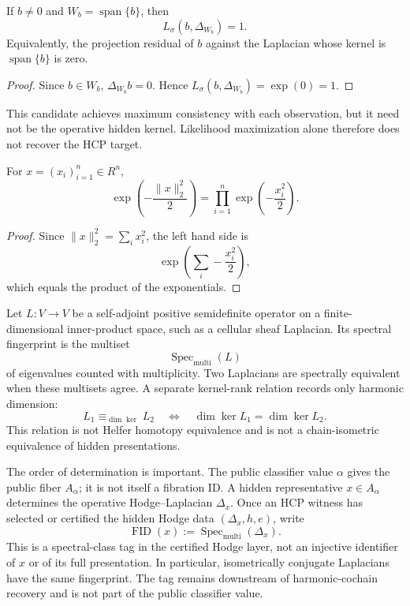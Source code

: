 \begin{proposition}\label{prop:single-observation-optimal-guess}
  If \(b\ne 0\) and \(W_b=\operatorname{span}\{b\}\), then
  \[
    L_\sigma(b,\Delta_{W_b})=1.
  \]
  Equivalently, the projection residual of \(b\) against the Laplacian whose
  kernel is \(\operatorname{span}\{b\}\) is zero.
\end{proposition}

\begin{proof}
  Since \(b\in W_b\), \(\Delta_{W_b}b=0\). Hence
  \(L_\sigma(b,\Delta_{W_b})=\exp(0)=1\).
\end{proof}

This candidate achieves maximum consistency with each observation, but it
need not be the operative hidden kernel. Likelihood maximization alone
therefore does not recover the HCP target.

\begin{proposition}\label{prop:gaussian-prior-factorization}
  For \(x=(x_i)_{i=1}^n\in R^n\),
  \[
    \exp\left(-\frac{\|x\|_2^2}{2}\right)
    =
    \prod_{i=1}^n
    \exp\left(-\frac{x_i^2}{2}\right).
  \]
\end{proposition}

\begin{proof}
  Since \(\|x\|_2^2=\sum_i x_i^2\), the left hand side is
  \[
    \exp\left(\sum_i -\frac{x_i^2}{2}\right),
  \]
  which equals the product of the exponentials.
\end{proof}

\begin{definition}\label{def:spectral-fingerprint}
  Let \(L:V\to V\) be a self-adjoint positive semidefinite operator on a
  finite-dimensional inner-product space, such as a cellular sheaf Laplacian.
  Its spectral fingerprint is the multiset
  \[
    \operatorname{Spec}_{\mathrm{multi}}(L)
  \]
  of eigenvalues counted with multiplicity. Two Laplacians are spectrally
  equivalent when these multisets agree. A separate kernel-rank relation
  records only harmonic dimension:
  \[
    L_1\equiv_{\dim\ker}L_2
    \quad\Longleftrightarrow\quad
    \dim\ker L_1=\dim\ker L_2.
  \]
  This relation is not Helfer homotopy equivalence and is not a chain-isometric
  equivalence of hidden presentations.
\end{definition}

The order of determination is important. The public classifier value
\(\alpha\) gives the public fiber \(A_\alpha\); it is not itself a fibration
ID. A hidden representative \(x\in A_\alpha\) determines the operative
Hodge--Laplacian \(\Delta_x\). Once an HCP witness has selected or certified
the hidden Hodge data \((\Delta_x,h,e)\), write
\[
  \operatorname{FID}(x):=
  \operatorname{Spec}_{\mathrm{multi}}(\Delta_x).
\]
This is a spectral-class tag in the certified Hodge layer, not an injective
identifier of \(x\) or of its full presentation. In particular, isometrically
conjugate Laplacians have the same fingerprint. The tag remains downstream of
harmonic-cochain recovery and is not part of the public classifier value.


